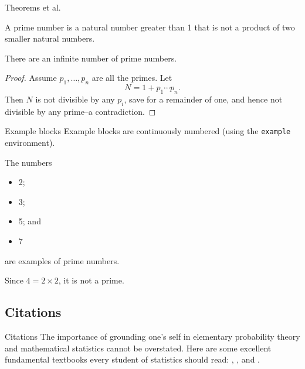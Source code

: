\documentclass[,aspectratio=43]{beamer}
\providecommand{\tightlist}{%
  \setlength{\itemsep}{0pt}\setlength{\parskip}{0pt}}
\begin{document}
\begin{frame}{Theorems et al.}
\label{theorems-et-al.}
\vspace{0.5em}

\begin{definition}
A prime number is a natural number greater than 1 that is not a product
of two smaller natural numbers.
\end{definition}

\begin{theorem}
There are an infinite number of prime numbers.
\end{theorem}

\begin{proof}
Assume \(p_1, \dots, p_n\) are all the primes. Let \[
N = 1 + p_1\cdots p_n.
\] Then \(N\) is not divisible by any \(p_i\), save for a remainder of
one, and hence not divisible by any prime--a contradiction.
\end{proof}
\end{frame}

\begin{frame}[fragile]{Example blocks}
\label{example-blocks}
Example blocks are continuously numbered (using the \texttt{example}
environment).

\begin{example}
The numbers

\begin{itemize}
\tightlist
\item
  2;
\item
  3;
\item
  5; and
\item
  7
\end{itemize}

are examples of prime numbers.
\end{example}

\begin{example}
Since \(4 = 2 \times 2\), it is not a prime.
\end{example}
\end{frame}

\subsection{Citations}\label{citations}

\begin{frame}{Citations}
The importance of grounding one's self in elementary probability theory
and mathematical statistics cannot be overstated. Here are some
excellent fundamental textbooks every student of statistics should read:
\textcite{casella2002statistical}, \textcite{pawitan2001all}, and
\textcite{wasserman2013all}.

\end{frame}
\end{document}
